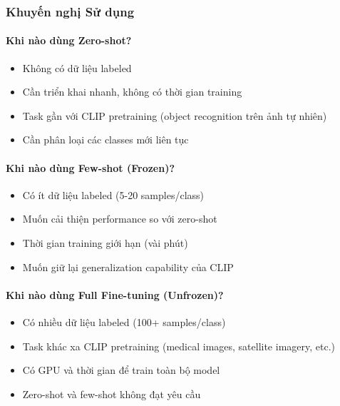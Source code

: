 \subsubsection{Khuyến nghị Sử dụng}

\paragraph{Khi nào dùng Zero-shot?}
\begin{itemize}
    \item Không có dữ liệu labeled
    \item Cần triển khai nhanh, không có thời gian training
    \item Task gần với CLIP pretraining (object recognition trên ảnh tự nhiên)
    \item Cần phân loại các classes mới liên tục
\end{itemize}

\paragraph{Khi nào dùng Few-shot (Frozen)?}
\begin{itemize}
    \item Có ít dữ liệu labeled (5-20 samples/class)
    \item Muốn cải thiện performance so với zero-shot
    \item Thời gian training giới hạn (vài phút)
    \item Muốn giữ lại generalization capability của CLIP
\end{itemize}

\paragraph{Khi nào dùng Full Fine-tuning (Unfrozen)?}
\begin{itemize}
    \item Có nhiều dữ liệu labeled (100+ samples/class)
    \item Task khác xa CLIP pretraining (medical images, satellite imagery, etc.)
    \item Có GPU và thời gian để train toàn bộ model
    \item Zero-shot và few-shot không đạt yêu cầu
\end{itemize}

